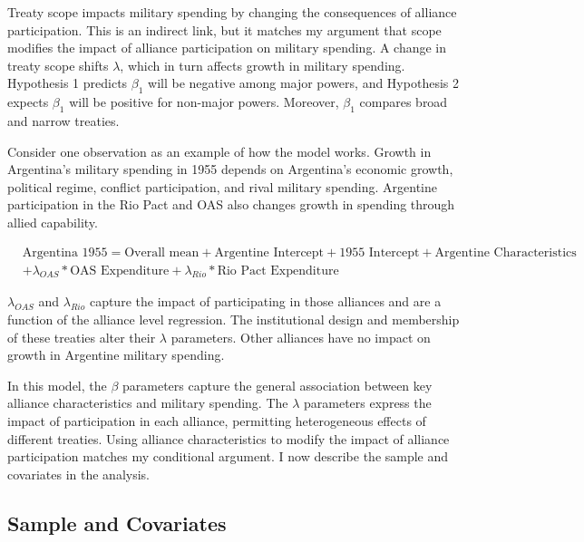 \documentclass[12pt]{article}
\begin{document}
Treaty scope impacts military spending by changing the consequences of alliance participation.
This is an indirect link, but it matches my argument that scope modifies the impact of alliance participation on military spending.  
A change in treaty scope shifts $\lambda$, which in turn affects growth in military spending.
Hypothesis 1 predicts $\beta_1$ will be negative among major powers, and Hypothesis 2 expects $\beta_1$ will be positive for non-major powers.
Moreover, $\beta_1$ compares broad and narrow treaties. 


Consider one observation as an example of how the model works. 
Growth in Argentina's military spending in 1955 depends on Argentina's economic growth, political regime, conflict participation, and rival military spending. 
Argentine participation in the Rio Pact and OAS also changes growth in spending through allied capability. 


\begin{equation}
\begin{split}
& \mbox{Argentina 1955} = \mbox{Overall mean}
+ \mbox{Argentine Intercept} + \mbox{1955 Intercept} 
+ \mbox{Argentine Characteristics} \\
& + \lambda_{OAS} * \mbox{OAS Expenditure} + \lambda_{Rio} * \mbox{Rio Pact Expenditure}
\end{split} 
\end{equation}


$\lambda_{OAS}$ and $\lambda_{Rio}$ capture the impact of participating in those alliances and are a function of the alliance level regression. 
The institutional design and membership of these treaties alter their $\lambda$ parameters.
Other alliances have no impact on growth in Argentine military spending. 


In this model, the $\beta$ parameters capture the general association between key alliance characteristics and military spending. 
The $\lambda$ parameters express the impact of participation in each alliance, permitting heterogeneous effects of different treaties. 
Using alliance characteristics to modify the impact of alliance participation matches my conditional argument. 
I now describe the sample and covariates in the analysis.  



\subsection{Sample and Covariates} 
\end{document}
